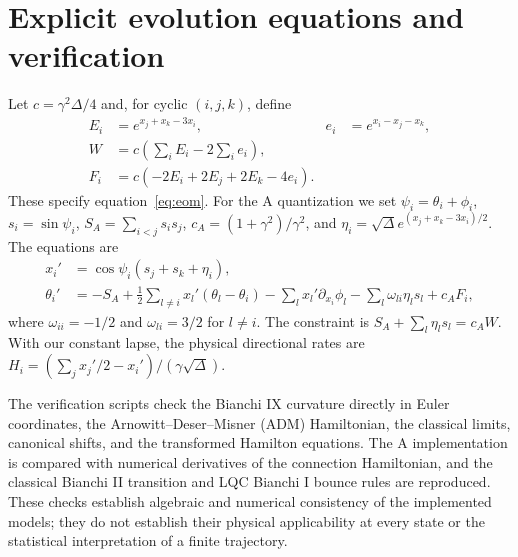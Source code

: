 \documentclass[12pt]{iopjournal}
\begin{document}
\section{Explicit evolution equations and verification}\label{app:checks}
Let $c=\gamma^2\Delta/4$ and, for cyclic $(i,j,k)$, define
\begin{align}
E_i&=e^{x_j+x_k-3x_i}, & e_i&=e^{x_i-x_j-x_k},\\
W&=c\left(\sum_i E_i-2\sum_i e_i\right),\\
F_i&=c(-2E_i+2E_j+2E_k-4e_i).
\end{align}
These specify equation~\eqref{eq:eom}. For the A quantization we set
$\psi_i=\theta_i+\phi_i$, $s_i=\sin\psi_i$,
$S_A=\sum_{i<j}s_i s_j$, $c_A=(1+\gamma^2)/\gamma^2$, and
$\eta_i=\sqrt\Delta e^{(x_j+x_k-3x_i)/2}$. The equations are
\begin{align}
x_i'&=\cos\psi_i(s_j+s_k+\eta_i),\\
\theta_i'&=-S_A+\tfrac12\sum_{l\ne i}x_l'(\theta_l-\theta_i)
 -\sum_l x_l'\partial_{x_i}\phi_l-\sum_l\omega_{li}\eta_l s_l+c_A F_i,
\end{align}
where $\omega_{ii}=-1/2$ and $\omega_{li}=3/2$ for $l\ne i$.
The constraint is $S_A+\sum_l\eta_l s_l=c_AW$. With our constant lapse, the physical directional rates are
$H_i=(\sum_jx_j'/2-x_i')/(\gamma\sqrt\Delta)$.

The verification scripts check the Bianchi IX curvature directly in Euler coordinates, the Arnowitt--Deser--Misner (ADM)
Hamiltonian, the classical limits, canonical shifts, and the transformed Hamilton equations.
The A implementation is compared with numerical derivatives of the connection Hamiltonian, and
the classical Bianchi II transition and LQC Bianchi I bounce rules are reproduced. These checks
establish algebraic and numerical consistency of the implemented models; they do not establish
their physical applicability at every state or the statistical interpretation of a finite trajectory.
\end{document}
